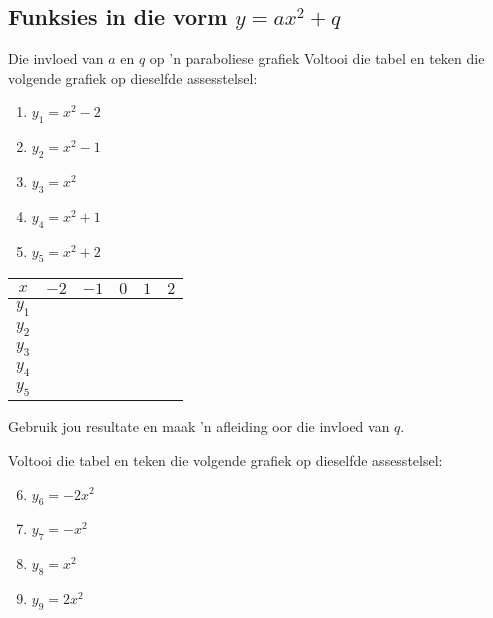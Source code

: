 \clearpage
\subsection*{Funksies in die vorm $y=a{x}^{2}+q$}
\begin{Investigation}{Die invloed van $a$ en $q$ op 'n paraboliese grafiek}
Voltooi die tabel en teken die volgende grafiek op dieselfde assesstelsel:
    \begin{enumerate}[noitemsep, label=\textbf{\arabic*}. ] 
    \item $y_1={x}^{2}-2$
    \item $y_2={x}^{2}-1$
    \item $y_3={x}^{2}$
    \item $y_4={x}^{2}+1$
    \item $y_5={x}^{2}+2$
    \end{enumerate}

\begin{table}[H]
  \begin{center}
    \begin{tabular}{|c|c|c|c|c|c|}\hline
      $x$ & $-2$ & $-1$ & $0$ & $1$ & $2$ \\ \hline
      $y_1$ & \hspace{1cm}  & \hspace{1cm}  & \hspace{1cm}  & \hspace{1cm}  & \hspace{1cm}  \\ \hline
      $y_2$ & & & & & \\ \hline
      $y_3$ & & & & & \\ \hline
      $y_4$ & & & & & \\ \hline
      $y_5$ & & & & & \\ \hline
    \end{tabular}
  \end{center}
\end{table}
Gebruik jou resultate en maak 'n afleiding oor die invloed van $q$.\\
\par
Voltooi die tabel en teken die volgende grafiek op dieselfde assesstelsel:
\begin{enumerate}[noitemsep, label=\textbf{\arabic*}. ] 
\setcounter{enumi}{5}
\item $y_6=-2{x}^{2}$
\item $y_7=-{x}^{2}$
\item $y_8={x}^{2}$
\item $y_9=2{x}^{2}$
\end{enumerate}


\end{Investigation}
